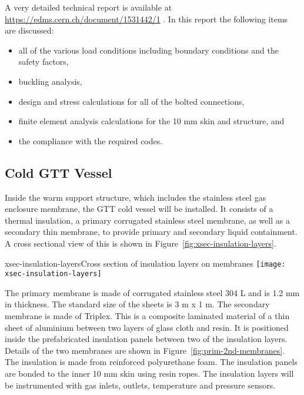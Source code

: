 A very detailed technical report is available at \url{https://edms.cern.ch/document/1531442/1} .
In this report the following items are discussed:
\begin{itemize}
\item all of the various load conditions including boundary conditions and the safety factors,
\item buckling analysis,
\item design and stress calculations for all of the bolted connections,
\item finite element analysis calculations for the 10 mm skin and structure, and
\item the compliance with the required codes.
\end{itemize}

\subsection{Cold GTT Vessel}

Inside the warm support structure, which includes the stainless steel gas enclosure membrane, the GTT cold vessel will be installed. It consists of a thermal insulation, a primary corrugated stainless steel membrane, as well as a secondary thin membrane, to provide primary and secondary liquid containment. A cross sectional view of this is shown in Figure~\ref{fig:xsec-insulation-layers}.

\begin{cdrfigure}{xsec-insulation-layers}{Cross section of insulation layers on membranes}
  \texttt{[image: xsec-insulation-layers]}
\end{cdrfigure}


The primary membrane is made of corrugated stainless steel 304 L and is 1.2 mm in thickness.  The standard size of the sheets is 3 m x 1 m.  The secondary membrane is made of Triplex.  This is a composite laminated material of a thin sheet of aluminium between two layers of glass cloth and resin.  It is positioned inside the prefabricated insulation panels between two of the insulation layers.  Details of the two membranes are shown in Figure~\ref{fig:prim-2nd-membranes}.   The insulation is made from reinforced polyurethane foam.  The insulation panels are bonded to the inner 10 mm skin using resin ropes.  The insulation layers will be instrumented with gas inlets, outlets, temperature and pressure sensors.


